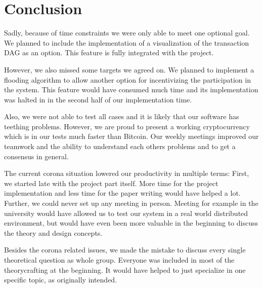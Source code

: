 \section{Conclusion}

Sadly, because of time constraints we were only able to meet one optional goal. We planned to include the implementation of a visualization of the transaction DAG as an option. This feature is fully integrated with the project.

However, we also missed some targets we agreed on. We planned to implement a flooding algorithm to allow another option for incentivizing the participation in the system. This feature would have consumed much time and its implementation was halted in in the second half of our implementation time. 

Also, we were not able to test all cases and it is likely that our software has teething problems. However, we are proud to present a working cryptocurrency which is in our tests much faster than Bitcoin. Our weekly meetings improved our teamwork and the ability to understand each others problems and to get a consensus in general.

The current corona situation lowered our productivity in multiple terms: First, we started late with the project part itself. More time for the project implementation and less time for the paper writing would have helped a lot.
Further, we could never set up any meeting in person. Meeting for example in the university would have allowed us to test our system in a real world distributed environment, but would have even been more valuable in the beginning to discuss the theory and design concepts.

Besides the corona related issues, we made the mistake to discuss every single theoretical question as whole group. Everyone was included in most of the theorycrafting at the beginning. It would have helped to just specialize in one specific topic, as originally intended.